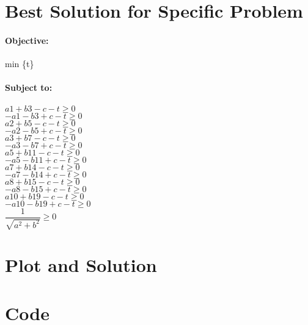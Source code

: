\documentclass{article}
\begin{document}
\section*{Best Solution for Specific Problem}
\paragraph*{Objective:}
min \{t\}

\paragraph*{Subject to:\\}
$a1 + b3 - c -t \geq 0$\\
$-a1 - b3 + c -t \geq 0$\\
$a2 + b5 - c -t \geq 0$\\
$-a2 - b5 + c -t \geq 0$\\
$a3 + b7 - c -t \geq 0$\\
$-a3 - b7 + c -t \geq 0$\\
$a5 + b11 - c -t \geq 0$\\
$-a5 - b11 + c -t \geq 0$\\
$a7 + b14 - c -t \geq 0$\\
$-a7 - b14 + c -t \geq 0$\\
$a8 + b15 - c -t \geq 0$\\
$-a8 - b15 + c -t \geq 0$\\
$a10 + b19 - c -t \geq 0$\\
$-a10 - b19 + c -t \geq 0$\\
$\dfrac{1} {\sqrt{a^2 + b^2}} \geq 0$


\section*{Plot and Solution}

\section*{Code}
\end{document}
